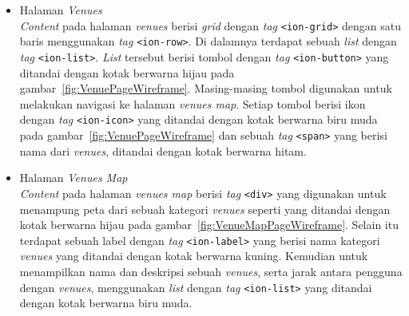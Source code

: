 \begin{enumerate}
\begin{itemize}
				\item Halaman \textit{Venues} \\
					\textit{Content} pada halaman \textit{venues} berisi \textit{grid} dengan \textit{tag} \texttt{<ion-grid>} dengan satu baris menggunakan \textit{tag} \texttt{<ion-row>}. Di dalamnya terdapat sebuah \textit{list} dengan \textit{tag} \texttt{<ion-list>}. \textit{List} tersebut berisi tombol dengan \textit{tag} \texttt{<ion-button>} yang ditandai dengan kotak berwarna hijau pada gambar~\ref{fig:VenuePageWireframe}. Masing-masing tombol digunakan untuk melakukan navigasi ke halaman \textit{venues map}. Setiap tombol berisi ikon dengan \textit{tag} \texttt{<ion-icon>} yang ditandai dengan kotak berwarna biru muda pada gambar~\ref{fig:VenuePageWireframe} dan sebuah \textit{tag} \texttt{<span>} yang berisi nama dari \textit{venues}, ditandai dengan kotak berwarna hitam.

				\item Halaman \textit{Venues Map} \\
					\textit{Content} pada halaman \textit{venues map} berisi \textit{tag} \texttt{<div>} yang digunakan untuk menampung peta dari sebuah kategori \textit{venues} seperti yang ditandai dengan kotak berwarna hijau pada gambar~\ref{fig:VenueMapPageWireframe}. Selain itu terdapat sebuah label dengan \textit{tag} \texttt{<ion-label>} yang berisi nama kategori \textit{venues} yang ditandai dengan kotak berwarna kuning. Kemudian untuk menampilkan nama dan deskripsi sebuah \textit{venues}, serta jarak antara pengguna dengan \textit{venues}, menggunakan \textit{list} dengan \textit{tag} \texttt{<ion-list>} yang ditandai dengan kotak berwarna biru muda. 
				
			\end{itemize}			  
	\end{enumerate}